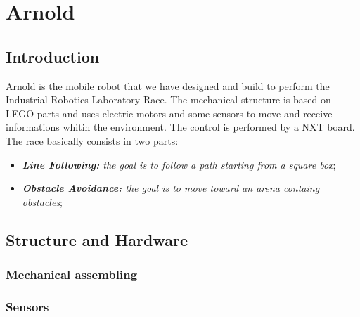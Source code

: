 \documentclass[a4paper,11pt,oneside]{book}
\begin{document}
\newpage
\thispagestyle{empty}



\tableofcontents \thispagestyle{empty}
\listoffigures\thispagestyle{empty}



\chapter{Arnold}

\section*{Introduction}

Arnold is the mobile robot that we have designed and build to perform the Industrial Robotics Laboratory Race. The mechanical structure is based on LEGO parts and uses electric motors and some sensors to move and receive informations whitin the environment. The control is performed by a NXT board. The race basically consists in two parts:
\begin{itemize}
	\item \textit{ \textbf {Line Following:} the goal is to follow a path starting from a square box};
	\item \textit{\textbf {Obstacle Avoidance:} the goal is to move toward an arena containg obstacles};

\end{itemize}
\section{Structure and Hardware}
\subsection {Mechanical assembling}
\subsection {Sensors}
\end{document}
